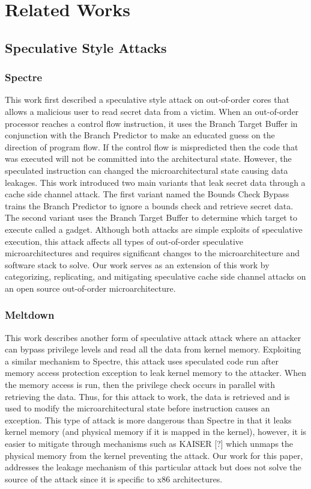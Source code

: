 \section{Related Works}

\subsection{Speculative Style Attacks}

\subsubsection{Spectre}

This work first described a speculative style attack on out-of-order cores that 
allows a malicious user to read secret data from a victim. When an out-of-order 
processor reaches a control flow instruction, it uses the Branch Target Buffer in 
conjunction with the Branch Predictor to make an educated guess on the direction
of program flow. If the control flow is mispredicted then the code that was
executed will not be committed into the architectural state. However, the
speculated instruction can changed the microarchitectural state causing data
leakages. This work introduced two main variants that leak secret data through
a cache side channel attack. The first variant named the Bounds Check Bypass
trains the Branch Predictor to ignore a bounds check and retrieve secret data. The
second variant uses the Branch Target Buffer to determine which target to execute
called a gadget. Although both attacks are simple exploits of speculative execution,
this attack affects all types of out-of-order speculative microarchitectures 
and requires significant changes to the microarchitecture and software stack to solve.
Our work serves as an extension of this work by categorizing, replicating, and mitigating
speculative cache side channel attacks on an open source out-of-order microarchitecture.

\subsubsection{Meltdown}

This work describes another form of speculative attack attack where an attacker 
can bypass privilege levels and read all the data from kernel memory. Exploiting a 
similar mechanism to Spectre, this attack uses speculated code run after memory access
protection exception to leak kernel memory to the attacker. When the memory access
is run, then the privilege check occurs in parallel with retrieving the data. Thus,
for this attack to work, the data is retrieved and is used to modify the 
microarchitectural state before instruction causes an exception. This type of attack
is more dangerous than Spectre in that it leaks kernel memory (and physical memory if
it is mapped in the kernel), however, it is easier to mitigate through mechanisms such
as KAISER [?] which unmaps the physical memory from the kernel preventing the attack.
Our work for this paper, addresses the leakage mechanism of this particular attack but 
does not solve the source of the attack since it is specific to x86 architectures.

